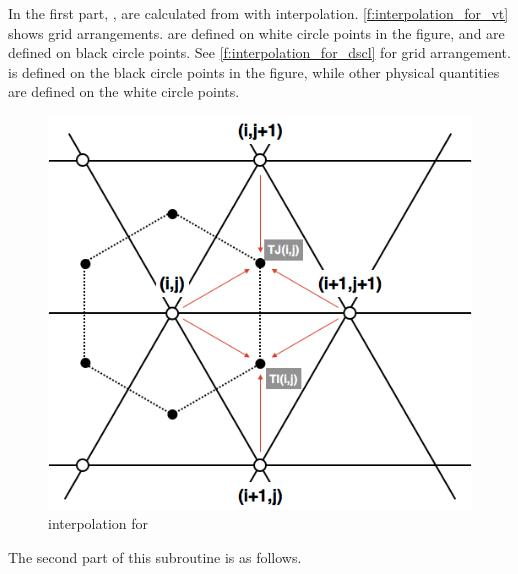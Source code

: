 In the first part, ,  are calculated
from  with interpolation.
\autoref{f:interpolation_for_vt} shows grid arrangements.
 are defined on white circle points in the figure,
and  are defined on black circle points.
See \autoref{f:interpolation_for_dscl} for grid arrangement.
 is defined on the black circle points in the figure,
while other physical quantities are defined on the white circle points.

\begin{figure}[htpb]
 \centering
 \includegraphics[scale=.4]{figs/diffusion_intp.png}
 \caption{interpolation for }
 \label{f:interpolation_for_vt}
\end{figure}


The second part of this subroutine is as follows.

